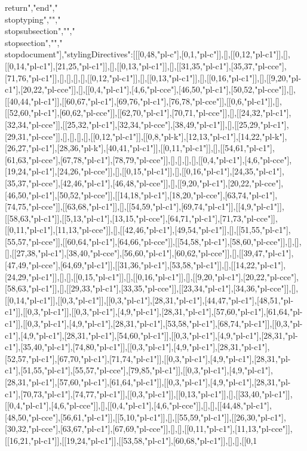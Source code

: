 return","end","\\stoptyping","","\\stopsubsection","","\\stopsection","","\\stopdocument"],"stylingDirectives":[[[0,48,"pl-c"],[0,1,"pl-c"]],[],[[0,12,"pl-c1"]],[],[[0,14,"pl-c1"],[21,25,"pl-c1"]],[],[[0,13,"pl-c1"]],[],[[31,35,"pl-c1"],[35,37,"pl-cce"],[71,76,"pl-c1"]],[],[],[],[],[[0,12,"pl-c1"]],[],[[0,13,"pl-c1"]],[],[[0,16,"pl-c1"]],[],[[9,20,"pl-c1"],[20,22,"pl-cce"]],[],[[0,4,"pl-c1"],[4,6,"pl-cce"],[46,50,"pl-c1"],[50,52,"pl-cce"]],[],[[40,44,"pl-c1"]],[[60,67,"pl-c1"],[69,76,"pl-c1"],[76,78,"pl-cce"]],[[0,6,"pl-c1"]],[],[[52,60,"pl-c1"],[60,62,"pl-cce"]],[[62,70,"pl-c1"],[70,71,"pl-cce"]],[],[[24,32,"pl-c1"],[32,34,"pl-cce"]],[[25,32,"pl-c1"],[32,34,"pl-cce"],[38,49,"pl-c1"]],[],[[25,29,"pl-c1"],[29,31,"pl-cce"]],[],[],[],[],[[0,12,"pl-c1"]],[[0,8,"pl-k"],[12,13,"pl-c1"],[14,22,"pl-k"],[26,27,"pl-c1"],[28,36,"pl-k"],[40,41,"pl-c1"]],[[0,11,"pl-c1"]],[],[[54,61,"pl-c1"],[61,63,"pl-cce"],[67,78,"pl-c1"],[78,79,"pl-cce"]],[],[],[],[],[[0,4,"pl-c1"],[4,6,"pl-cce"],[19,24,"pl-c1"],[24,26,"pl-cce"]],[],[[0,15,"pl-c1"]],[],[[0,16,"pl-c1"],[24,35,"pl-c1"],[35,37,"pl-cce"],[42,46,"pl-c1"],[46,48,"pl-cce"]],[],[[9,20,"pl-c1"],[20,22,"pl-cce"],[46,50,"pl-c1"],[50,52,"pl-cce"]],[[14,18,"pl-c1"],[18,20,"pl-cce"],[63,74,"pl-c1"],[74,75,"pl-cce"]],[[63,68,"pl-c1"]],[],[[54,59,"pl-c1"],[69,74,"pl-c1"]],[[4,9,"pl-c1"]],[[58,63,"pl-c1"]],[[5,13,"pl-c1"],[13,15,"pl-cce"],[64,71,"pl-c1"],[71,73,"pl-cce"]],[[0,11,"pl-c1"],[11,13,"pl-cce"]],[],[[42,46,"pl-c1"],[49,54,"pl-c1"]],[],[[51,55,"pl-c1"],[55,57,"pl-cce"]],[[60,64,"pl-c1"],[64,66,"pl-cce"]],[[54,58,"pl-c1"],[58,60,"pl-cce"]],[],[],[],[[27,38,"pl-c1"],[38,40,"pl-cce"],[56,60,"pl-c1"],[60,62,"pl-cce"]],[],[[39,47,"pl-c1"],[47,49,"pl-cce"],[64,69,"pl-c1"]],[[31,36,"pl-c1"],[53,58,"pl-c1"]],[],[[14,22,"pl-c1"],[24,29,"pl-c1"]],[],[],[[0,15,"pl-c1"]],[],[[0,16,"pl-c1"]],[],[[9,20,"pl-c1"],[20,22,"pl-cce"],[58,63,"pl-c1"]],[],[[29,33,"pl-c1"],[33,35,"pl-cce"]],[[23,34,"pl-c1"],[34,36,"pl-cce"]],[],[[0,14,"pl-c1"]],[[0,3,"pl-c1"]],[[0,3,"pl-c1"],[28,31,"pl-c1"],[44,47,"pl-c1"],[48,51,"pl-c1"]],[[0,3,"pl-c1"]],[[0,3,"pl-c1"],[4,9,"pl-c1"],[28,31,"pl-c1"],[57,60,"pl-c1"],[61,64,"pl-c1"]],[[0,3,"pl-c1"],[4,9,"pl-c1"],[28,31,"pl-c1"],[53,58,"pl-c1"],[68,74,"pl-c1"]],[[0,3,"pl-c1"],[4,9,"pl-c1"],[28,31,"pl-c1"],[54,60,"pl-c1"]],[[0,3,"pl-c1"],[4,9,"pl-c1"],[28,31,"pl-c1"],[35,40,"pl-c1"],[74,80,"pl-c1"]],[[0,3,"pl-c1"],[4,9,"pl-c1"],[28,31,"pl-c1"],[52,57,"pl-c1"],[67,70,"pl-c1"],[71,74,"pl-c1"]],[[0,3,"pl-c1"],[4,9,"pl-c1"],[28,31,"pl-c1"],[51,55,"pl-c1"],[55,57,"pl-cce"],[79,85,"pl-c1"]],[[0,3,"pl-c1"],[4,9,"pl-c1"],[28,31,"pl-c1"],[57,60,"pl-c1"],[61,64,"pl-c1"]],[[0,3,"pl-c1"],[4,9,"pl-c1"],[28,31,"pl-c1"],[70,73,"pl-c1"],[74,77,"pl-c1"]],[[0,3,"pl-c1"]],[[0,13,"pl-c1"]],[],[[33,40,"pl-c1"]],[[0,4,"pl-c1"],[4,6,"pl-cce"]],[],[[0,4,"pl-c1"],[4,6,"pl-cce"]],[],[],[[44,48,"pl-c1"],[48,50,"pl-cce"],[56,61,"pl-c1"]],[[5,10,"pl-c1"]],[],[[55,59,"pl-c1"]],[[26,30,"pl-c1"],[30,32,"pl-cce"],[63,67,"pl-c1"],[67,69,"pl-cce"]],[],[],[[0,11,"pl-c1"],[11,13,"pl-cce"]],[[16,21,"pl-c1"]],[[19,24,"pl-c1"]],[[53,58,"pl-c1"],[60,68,"pl-c1"]],[],[],[[0,1